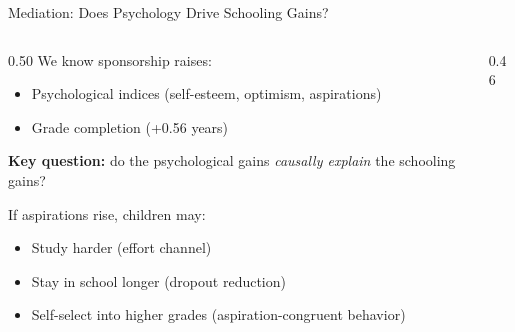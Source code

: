 \documentclass[aspectratio=169, 10pt]{beamer}
\begin{document}
\begin{frame}{Mediation: Does Psychology Drive Schooling Gains?}
  \begin{columns}
    \begin{column}{0.50\textwidth}
      We know sponsorship raises:
      \begin{itemize}
        \item Psychological indices (self-esteem, optimism, aspirations)
        \item Grade completion (+0.56 years)
      \end{itemize}
      \vspace{0.4em}
      \textbf{Key question:} do the psychological gains \emph{causally explain} the schooling gains?
      \vspace{0.4em}

      If aspirations rise, children may:
      \begin{itemize}
        \item Study harder (effort channel)
        \item Stay in school longer (dropout reduction)
        \item Self-select into higher grades (aspiration-congruent behavior)
      \end{itemize}
    \end{column}
    \begin{column}{0.46\textwidth}
      \begin{center}
\end{center}
\end{column}
\end{columns}
\end{frame}
\end{document}
